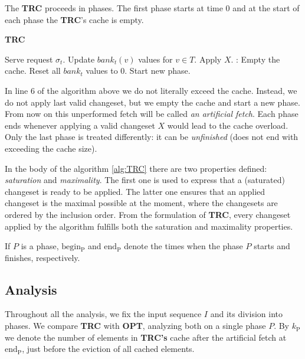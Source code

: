 The \textbf{TRC} proceeds in phases. The first phase starts at time 0 and at the
start of each phase the \textbf{TRC}'s cache is empty.  \begin{algorithm}
\caption{\textbf{TRC}} \label{alg:TRC} \begin{algorithmic}[1]  \State Serve request $\sigma_t$.  \State Update $bank_t(v)$
values for $v \in T$.   \State Apply $X$.  : \State Empty the cache.  \State Reset all $bank_t$ values to 0.
\State Start new phase.  \EndIf \EndIf \EndFor \end{algorithmic} \end{algorithm}

In line 6 of the algorithm above we do not literally exceed the cache. Instead,
we do not apply last valid changeset, but we empty the cache and start a new
phase. From now on this unperformed fetch will be called \textit{an artificial
fetch}. Each phase ends whenever applying a valid changeset $X$ would lead to the
cache overload. Only the last phase is treated differently: it can be
\textit{unfinished} (does not end with exceeding the cache size). 

In the body of the algorithm \ref{alg:TRC} there are two properties defined:
\textit{saturation} and \textit{maximality}. The first one is used to express
that a (saturated) changeset is ready to be applied. The latter one ensures that
an applied changeset is the maximal possible at the moment, where the changesets
are ordered by the inclusion order. From the formulation of \textbf{TRC}, every
changeset applied by the algorithm fulfills both the saturation and maximality
properties.

If $P$ is a phase, $\mathrm{begin_P}$ and $\mathrm{end_P}$ 
denote the times when the phase $P$ starts and finishes, respectively.

\subsection{Analysis} Throughout all the analysis, we fix the input sequence $I$
and its division into phases. We compare \textbf{TRC} with \textbf{OPT},
analyzing both on a single phase $P$. By $k_{\mathrm{P}}$ we denote the number of elements
in \textbf{TRC's} cache after the artificial fetch at $\mathrm{end_P}$, just before the
eviction of all cached elements.


